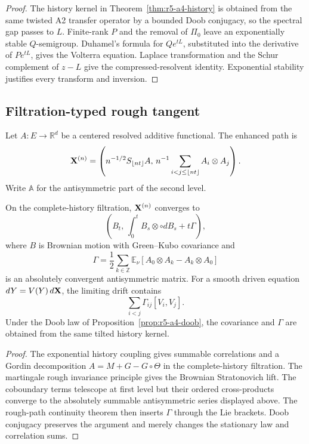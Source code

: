 \begin{proof}
The history kernel in Theorem~\ref{thm:r5-a4-history} is obtained from the
same twisted A2 transfer operator by a bounded Doob conjugacy, so the
spectral gap passes to \(L\).  Finite-rank \(P\) and the removal of
\(\Pi_0\) leave an exponentially stable \(Q\)-semigroup.  Duhamel's formula
for \(Qe^{tL}\), substituted into the derivative of \(Pe^{tL}\), gives the
Volterra equation.  Laplace transformation and the Schur complement of
\(z-L\) give the compressed-resolvent identity.  Exponential stability
justifies every transform and inversion.
\end{proof}

\subsection{Filtration-typed rough tangent}

Let \(A:E\to\mathbb R^d\) be a centered resolved additive functional.  The
enhanced path is
\[
 {\bf X}^{(n)}
 =\left(
 n^{-1/2}S_{\lfloor nt\rfloor}A,\,
 n^{-1}\sum_{i<j\le\lfloor nt\rfloor}
 A_i\otimes A_j
 \right).
\]
Write \(\mathbb A\) for the antisymmetric part of the second level.

\begin{theorem}
\label{thm:r5-a4-rough}
On the complete-history filtration,
\({\bf X}^{(n)}\) converges to
\[
 \left(B_t,\,
 \int_0^tB_s\otimes\circ dB_s+t\Gamma\right),
\]
where \(B\) is Brownian motion with Green--Kubo covariance and
\[
 \Gamma
 =\frac12\sum_{k\in\mathbb Z}
 \mathbb E_\nu[A_0\otimes A_k-A_k\otimes A_0]
\]
is an absolutely convergent antisymmetric matrix.  For a smooth driven
equation \(dY=V(Y)\,d{\bf X}\), the limiting drift contains
\[
 \sum_{i<j}\Gamma_{ij}[V_i,V_j].
\]
Under the Doob law of Proposition~\ref{prop:r5-a4-doob}, the covariance and
\(\Gamma\) are obtained from the same tilted history kernel.
\end{theorem}

\begin{proof}
The exponential history coupling gives summable correlations and a
Gordin decomposition \(A=M+G-G\circ\Theta\) in the complete-history
filtration.  The martingale rough invariance principle gives the Brownian
Stratonovich lift.  The coboundary terms telescope at first level but their
ordered cross-products converge to the absolutely summable antisymmetric
series displayed above.  The rough-path continuity theorem then inserts
\(\Gamma\) through the Lie brackets.  Doob conjugacy preserves the argument
and merely changes the stationary law and correlation sums.
\end{proof}

